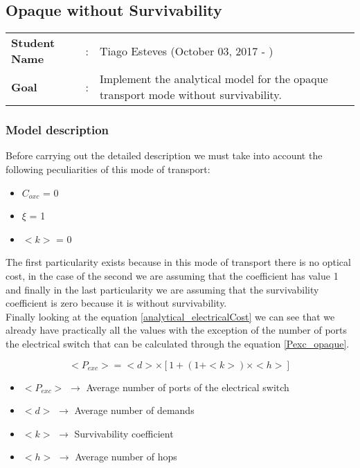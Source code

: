 \clearpage

\subsection{Opaque without Survivability}\label{analytical_Opaque_Survivability}
\begin{tcolorbox}	
\begin{tabular}{p{2.75cm} p{0.2cm} p{10.5cm}} 	
\textbf{Student Name}  &:& Tiago Esteves    (October 03, 2017 - )\\
\textbf{Goal}          &:& Implement the analytical model for the opaque transport mode without survivability.
\end{tabular}
\end{tcolorbox}

\subsubsection{Model description}

Before carrying out the detailed description we must take into account the following peculiarities of this mode of transport:
\begin{itemize}
  \item $C_{oxc}$ = 0
  \item $\xi$ = 1
  \item $<k>$ = 0
\end{itemize}

\vspace{11pt}
The first particularity exists because in this mode of transport there is no optical cost, in the case of the second we are assuming that the coefficient has value 1 and finally in the last particularity we are assuming that the survivability coefficient is zero because it is without survivability.\\

Finally looking at the equation \ref{analytical_electricalCost} we can see that we already have practically all the values with the exception of the number of ports the electrical switch that can be calculated through the equation \ref{Pexc_opaque}.

\begin{equation}
<P_{exc}> = <d> \times [1 + \left(1 + <k>\right) \times <h>]
\label{Pexc_opaque}
\end{equation}

\begin{itemize}
\item{$<P_{exc}>$ $\rightarrow$ Average number of ports of the electrical switch}
\item{$<d>$		  $\rightarrow$ Average number of demands}
\item{$<k>$		  $\rightarrow$ Survivability coefficient}	
\item{$<h>$	      $\rightarrow$ Average number of hops}
\end{itemize}

